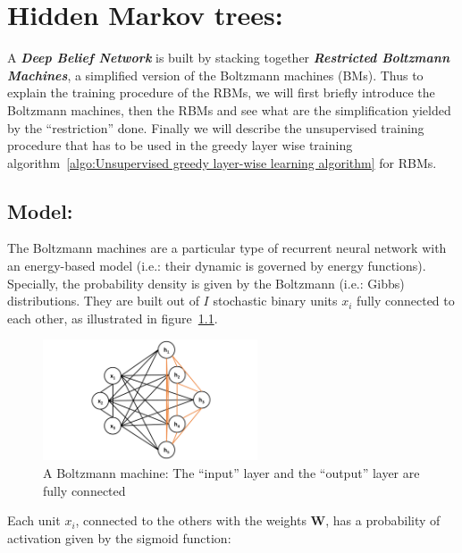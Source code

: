 \documentclass[a4paper,11pt]{report}
\newcommand{\Important}[1]{\textbf{{\em #1}}}
\begin{document}
				
\chapter{Hidden Markov trees:}
\label{chap:DBN:}
	A \Important{Deep Belief Network} is built by stacking together \Important{Restricted Boltzmann Machines}, a simplified version of the Boltzmann machines (BMs). 	Thus to explain the training procedure of the RBMs, we will first briefly introduce the Boltzmann machines, then the RBMs and see what are the simplification yielded by the ``restriction'' done. Finally we will describe the unsupervised training procedure that has to be used in the greedy layer wise training algorithm~\ref{algo:Unsupervised greedy layer-wise learning algorithm} for RBMs.
	
	
  \section{Model:}
    \label{seq:DBN/The Boltzmann machine:}
    The Boltzmann machines  \cite{Hinton_1986} are a particular type of recurrent neural network with an energy-based model (i.e.: their dynamic is governed by energy functions). Specially, the probability density is given by the Boltzmann (i.e.: Gibbs) distributions. They are built out of $I$ stochastic binary units $x_{i}$ fully connected to each other, as illustrated in figure~\ref{fig:A Boltzmann machine}.
    
		\begin{figure}[H]
			\begin{center}
				\includegraphics[width=2.5in]{Images/RBM_DNN/boltzmann_machine.pdf}
				\caption[A Boltzmann machine]{A Boltzmann machine: The ``input'' layer and the ``output'' layer are fully connected}
				\label{fig:A Boltzmann machine}
			\end{center}
		\end{figure}
		
		 Each unit $x_{i}$, connected to the others with the weights $\mathbf{W}$, has a probability of activation given by the sigmoid function:
		 
\end{document}
